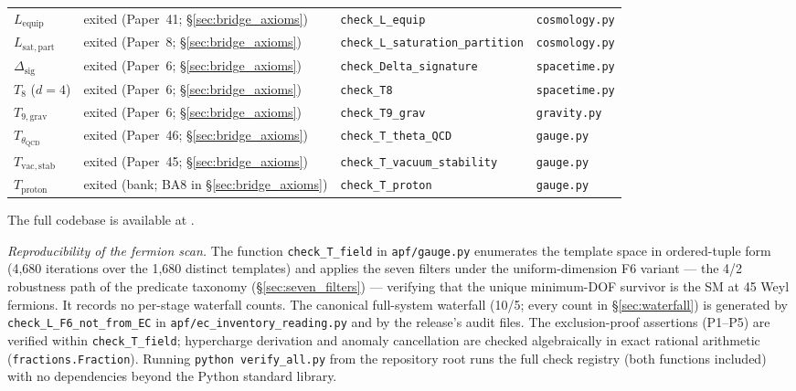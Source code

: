 \documentclass[11pt]{article}
\theoremstyle{definition}
\begin{document}
\begin{center}
{\begin{tabular}{@{}llll@{}}
$L_{\mathrm{equip}}$ & exited (Paper~41; \S\ref{sec:bridge_axioms}) & \texttt{check\_L\_equip} & \texttt{cosmology.py} \\
$L_{\mathrm{sat,part}}$ & exited (Paper~8; \S\ref{sec:bridge_axioms}) & \texttt{check\_L\_saturation\_partition} & \texttt{cosmology.py} \\
$\Delta_{\mathrm{sig}}$ & exited (Paper~6; \S\ref{sec:bridge_axioms}) & \texttt{check\_Delta\_signature} & \texttt{spacetime.py} \\
$T_8$ ($d{=}4$) & exited (Paper~6; \S\ref{sec:bridge_axioms}) & \texttt{check\_T8} & \texttt{spacetime.py} \\
$T_{9,\mathrm{grav}}$ & exited (Paper~6; \S\ref{sec:bridge_axioms}) & \texttt{check\_T9\_grav} & \texttt{gravity.py} \\
$T_{\theta_{\mathrm{QCD}}}$ & exited (Paper~46; \S\ref{sec:bridge_axioms}) & \texttt{check\_T\_theta\_QCD} & \texttt{gauge.py} \\
$T_{\mathrm{vac,stab}}$ & exited (Paper~45; \S\ref{sec:bridge_axioms}) & \texttt{check\_T\_vacuum\_stability} & \texttt{gauge.py} \\
$T_{\mathrm{proton}}$ & exited (bank; BA8 in \S\ref{sec:bridge_axioms}) & \texttt{check\_T\_proton} & \texttt{gauge.py} \\
\bottomrule
\end{tabular}}
\end{center}

\smallskip\noindent The full codebase is available at
\texttt{}.

\smallskip\noindent\textit{Reproducibility of the fermion scan.}\quad
The function \texttt{check\_T\_field} in \texttt{apf/gauge.py}
enumerates the template space in ordered-tuple form (4{,}680
iterations over the 1{,}680 distinct templates) and applies the seven
filters under the uniform-dimension F6 variant --- the 4/2 robustness
path of the predicate taxonomy (\S\ref{sec:seven_filters}) ---
verifying that the unique minimum-DOF survivor is the SM at 45 Weyl
fermions.  It records no per-stage waterfall counts.  The canonical
full-system waterfall (10/5; every count in \S\ref{sec:waterfall}) is
generated by \texttt{check\_L\_F6\_not\_from\_EC} in
\texttt{apf/ec\_inventory\_reading.py} and by the release's audit
files.  The exclusion-proof assertions (P1--P5) are verified within
\texttt{check\_T\_field}; hypercharge derivation and anomaly
cancellation are checked algebraically in exact rational arithmetic
(\texttt{fractions.Fraction}).  Running
\texttt{python verify\_all.py} from the repository root runs the full
check registry (both functions included) with no dependencies beyond
the Python standard library.
\end{document}
